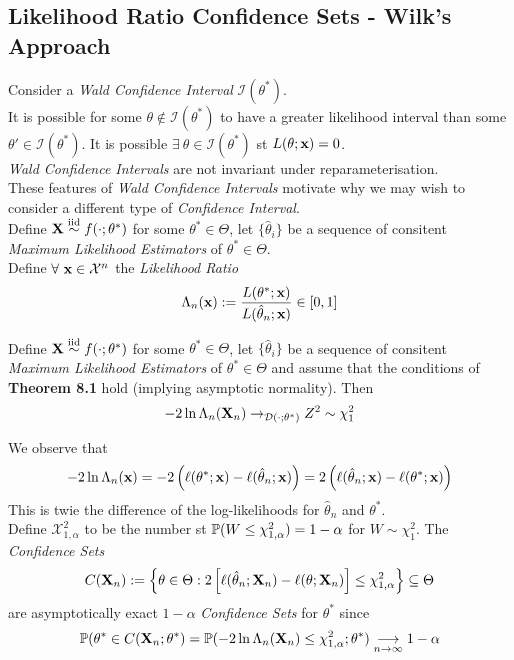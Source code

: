 \documentclass[11pt,a4paper]{article}
\begin{document}
\subsection{Likelihood Ratio Confidence Sets - Wilk's Approach}

Consider a \textit{Wald Confidence Interval} $\mathcal{I}(\theta^*)$.\\
It is possible for some $\theta\not\in\mathcal{I}(\theta^*)$ to have a greater likelihood interval than some $\theta'\in\mathcal{I}(\theta^*)$. It is possible $\exists\ \theta\in\mathcal{I}(\theta^*)$ st $L(\theta;\textbf{x})=0$.\\
\textit{Wald Confidence Intervals} are not invariant under reparameterisation.\\
These features of \textit{Wald Confidence Intervals} motivate why we may wish to consider a different type of \textit{Confidence Interval}.\\

Define $\textbf{X}\overset{\text{iid}}{\sim} f(\cdot;\theta^*)$ for some $\theta^*\in\Theta$, let $\{\hat\theta_i\}$ be a sequence of consitent \textit{Maximum Likelihood Estimators} of $\theta^*\in\Theta$.\\
Define $\forall\ \textbf{x}\in\mathcal{X}^n$ the \textit{Likelihood Ratio}
$$\Lambda_n(\textbf{x}):=\frac{L(\theta^*;\textbf{x})}{L(\hat\theta_n;\textbf{x})}\in[0,1]$$

\theorem{}
Define $\textbf{X}\overset{\text{iid}}{\sim} f(\cdot;\theta^*)$ for some $\theta^*\in\Theta$, let $\{\hat\theta_i\}$ be a sequence of consitent \textit{Maximum Likelihood Estimators} of $\theta^*\in\Theta$ and assume that the conditions of \textbf{Theorem 8.1} hold (implying asymptotic normality). Then
$$-2\ln\Lambda_n(\textbf{X}_n)\to_{\mathcal{D}(\cdot;\theta^*)}Z^2\sim\chi^2_1$$

\remark{}
We observe that
$$-2\ln\Lambda_n(\textbf{x})=-2\left(\ell(\theta^*;\textbf{x})-\ell(\hat\theta_n;\textbf{x})\right)=2\left(\ell(\hat\theta_n;\textbf{x})-\ell(\theta^*;\textbf{x})\right)$$
\ie This is twie the difference of the log-likelihoods for $\hat\theta_n$ and $\theta^*$.\\

Define $\mathcal{X}^2_{1,\alpha}$ to be the number st $\mathbb{P}(W\leq\chi^2_{1,\alpha})=1-\alpha$ for $W\sim\chi^2_1$. The \textit{Confidence Sets}
$$C(\textbf{X}_n):=\left\{\theta\in\Theta:2\left[\ell(\hat\theta_n;\textbf{X}_n)-\ell(\theta;\textbf{X}_n)\right]\leq\chi^2_{1,\alpha}\right\}\subseteq\Theta$$
are asymptotically exact $1-\alpha$ \textit{Confidence Sets} for $\theta^*$ since
$$\mathbb{P}(\theta^*\in C(\textbf{X}_n;\theta^*)=\mathbb{P}(-2\ln\Lambda_n(\textbf{X}_n)\leq\chi^2_{1,\alpha};\theta^*)\underset{n\to\infty}{\longrightarrow}1-\alpha$$
\end{document}
